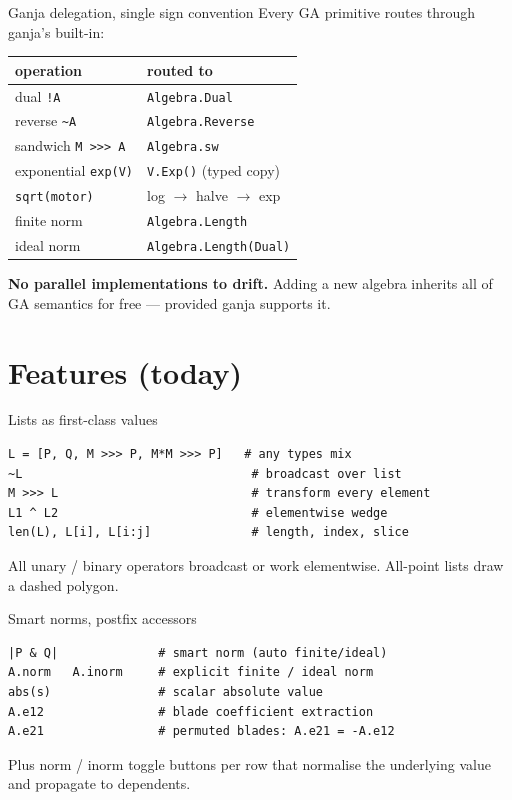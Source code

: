 \documentclass[aspectratio=169,11pt]{beamer}
\begin{document}
\begin{frame}{Ganja delegation, single sign convention}
  Every GA primitive routes through ganja's built-in:

  \begin{center}
  \begin{tabular}{ll}
    \toprule
    \textbf{operation} & \textbf{routed to} \\
    \midrule
    dual \texttt{!A}            & \texttt{Algebra.Dual} \\
    reverse \texttt{\textasciitilde A} & \texttt{Algebra.Reverse} \\
    sandwich \texttt{M >>> A}   & \texttt{Algebra.sw} \\
    exponential \texttt{exp(V)} & \texttt{V.Exp()} (typed copy) \\
    \texttt{sqrt(motor)}        & log \(\to\) halve \(\to\) exp \\
    finite norm                 & \texttt{Algebra.Length} \\
    ideal norm                  & \texttt{Algebra.Length(Dual)} \\
    \bottomrule
  \end{tabular}
  \end{center}

  \medskip
  \textbf{No parallel implementations to drift.} Adding a new algebra
  inherits all of GA semantics for free — provided ganja supports it.
\end{frame}

\section{Features (today)}

\begin{frame}[fragile]{Lists as first-class values}
\begin{lstlisting}
L = [P, Q, M >>> P, M*M >>> P]   # any types mix
~L                                # broadcast over list
M >>> L                           # transform every element
L1 ^ L2                           # elementwise wedge
len(L), L[i], L[i:j]              # length, index, slice
\end{lstlisting}
  All unary / binary operators broadcast or work elementwise.
  All-point lists draw a dashed polygon.
\end{frame}

\begin{frame}[fragile]{Smart norms, postfix accessors}
\begin{lstlisting}
|P & Q|              # smart norm (auto finite/ideal)
A.norm   A.inorm     # explicit finite / ideal norm
abs(s)               # scalar absolute value
A.e12                # blade coefficient extraction
A.e21                # permuted blades: A.e21 = -A.e12
\end{lstlisting}
  Plus norm / inorm toggle buttons per row that normalise the underlying
  value and propagate to dependents.
\end{frame}
\end{document}
